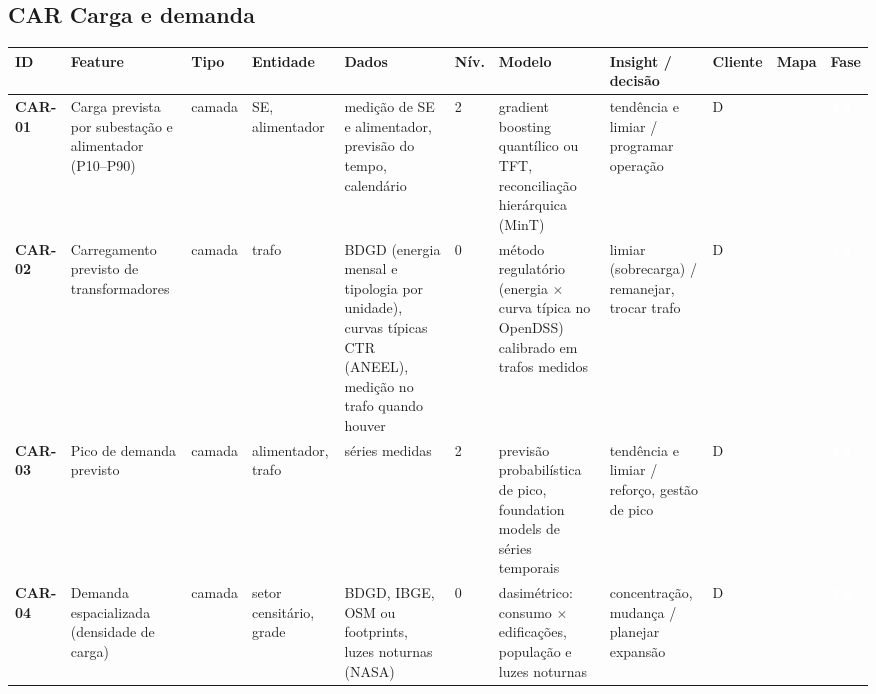 \subsection*{CAR \textperiodcentered{} Carga e demanda}
\label{cat:CAR}
{\footnotesize\setlength{\tabcolsep}{3pt}
\begin{longtable}{@{}P{1.35cm}P{4.1cm}P{1.3cm}P{3.1cm}P{3.7cm}C{0.6cm}P{3.6cm}P{3.3cm}P{1.1cm}P{0.9cm}P{1.1cm}@{}}
\toprule
\textbf{ID} & \textbf{Feature} & \textbf{Tipo} & \textbf{Entidade} & \textbf{Dados} & \textbf{Nív.} & \textbf{Modelo} & \textbf{Insight / decisão} & \textbf{Cliente} & \textbf{Mapa} & \textbf{Fase} \\
\midrule\endhead
\textbf{CAR-01} & Carga prevista por subestação e alimentador (P10--P90) & camada & SE, alimentador & medição de SE e alimentador, previsão do tempo, calendário & 2 & gradient boosting quantílico ou TFT, reconciliação hierárquica (MinT) & tendência e limiar / programar operação & D &  & \colorbox{fV2}{\scriptsize \textcolor{white}{\textbf{V2}}} \\
\textbf{CAR-02} & Carregamento previsto de transformadores & camada & trafo & BDGD (energia mensal e tipologia por unidade), curvas típicas CTR (ANEEL), medição no trafo quando houver & 0 & método regulatório (energia $\times$ curva típica no OpenDSS) calibrado em trafos medidos & limiar (sobrecarga) / remanejar, trocar trafo & D &  & \colorbox{fV2}{\scriptsize \textcolor{white}{\textbf{V2}}} \\
\textbf{CAR-03} & Pico de demanda previsto & camada & alimentador, trafo & séries medidas & 2 & previsão probabilística de pico, foundation models de séries temporais & tendência e limiar / reforço, gestão de pico & D &  & \colorbox{fV2}{\scriptsize \textcolor{white}{\textbf{V2}}} \\
\textbf{CAR-04} & Demanda espacializada (densidade de carga) & camada & setor censitário, grade & BDGD, IBGE, OSM ou footprints, luzes noturnas (NASA) & 0 & dasimétrico: consumo $\times$ edificações, população e luzes noturnas & concentração, mudança / planejar expansão & D &  & \colorbox{fV2}{\scriptsize \textcolor{white}{\textbf{V2}}} \\

\end{longtable}}
